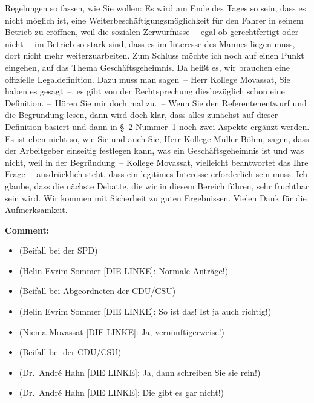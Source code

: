 \documentclass{article}
\begin{document}
Regelungen so fassen, wie Sie wollen: Es wird am Ende des Tages so sein, dass es nicht möglich ist, eine Weiterbeschäftigungsmöglichkeit für den Fahrer in seinem Betrieb zu eröffnen, weil die sozialen Zerwürfnisse – egal ob gerechtfertigt oder nicht – im Betrieb so stark sind, dass es im Interesse des Mannes liegen muss, dort nicht mehr weiterzuarbeiten. Zum Schluss möchte ich noch auf einen Punkt eingehen, auf das Thema Geschäftsgeheimnis. Da heißt es, wir brauchen eine offizielle Legaldefinition. Dazu muss man sagen – Herr Kollege Movassat, Sie haben es gesagt –, es gibt von der Rechtsprechung diesbezüglich schon eine Definition.  – Hören Sie mir doch mal zu. – Wenn Sie den Referentenentwurf und die Begründung lesen, dann wird doch klar, dass alles zunächst auf dieser Definition basiert und dann in § 2 Nummer 1 noch zwei Aspekte ergänzt werden. Es ist eben nicht so, wie Sie und auch Sie, Herr Kollege Müller-Böhm, sagen, dass der Arbeitgeber einseitig festlegen kann, was ein Geschäftsgeheimnis ist und was nicht, weil in der Begründung – Kollege Movassat, vielleicht beantwortet das Ihre Frage – ausdrücklich steht, dass ein legitimes Interesse erforderlich sein muss. Ich glaube, dass die nächste Debatte, die wir in diesem Bereich führen, sehr fruchtbar sein wird. Wir kommen mit Sicherheit zu guten Ergebnissen. Vielen Dank für die Aufmerksamkeit.  

\noindent\textbf{Comment:}
\begin{itemize}
    \setlength\itemsep{-3pt}
    \item (Beifall bei der SPD)
    \setlength\itemsep{-3pt}
    \item (Helin Evrim Sommer [DIE LINKE]: Normale Anträge!)
    \setlength\itemsep{-3pt}
    \item (Beifall bei Abgeordneten der CDU/CSU)
    \setlength\itemsep{-3pt}
    \item (Helin Evrim Sommer [DIE LINKE]: So ist das! Ist ja auch richtig!)
    \setlength\itemsep{-3pt}
    \item (Niema Movassat [DIE LINKE]: Ja, vernünftigerweise!)
    \setlength\itemsep{-3pt}
    \item (Beifall bei der CDU/CSU)
    \setlength\itemsep{-3pt}
    \item (Dr. André Hahn [DIE LINKE]: Ja, dann schreiben Sie sie rein!)
    \setlength\itemsep{-3pt}
    \item (Dr. André Hahn [DIE LINKE]: Die gibt es gar nicht!)
\end{itemize}
\end{document}
